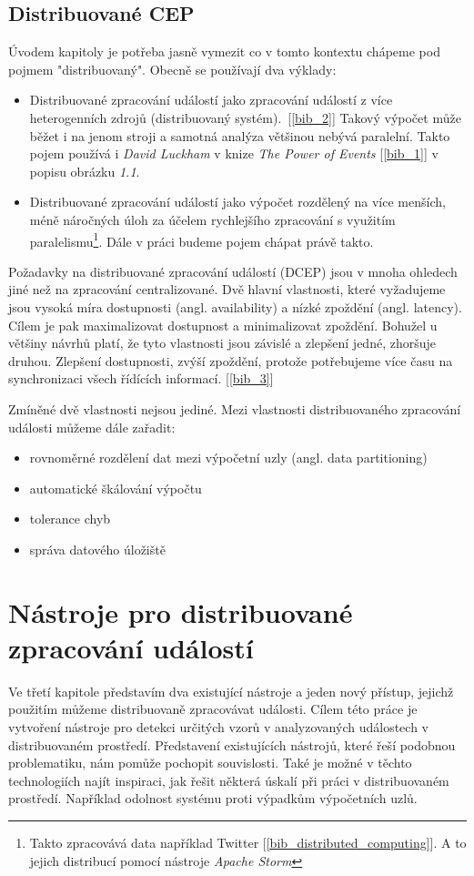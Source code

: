 \documentclass[
  digital, %
  table,   %
  nolof,     %
  nolot,     %
  oneside, %
  nocover,
  monochrome,
  12pt
]{fithesis3}
\begin{document}
\section{Distribuované CEP}
Úvodem kapitoly je potřeba jasně vymezit co v tomto kontextu chápeme pod pojmem "distribuovaný". Obecně se používají dva výklady:
\begin{itemize}
  \item Distribuované zpracování událostí jako zpracování událostí z více heterogenních zdrojů (distribuovaný systém).~[\ref{bib_2}] Takový výpočet může běžet i na jenom stroji a samotná analýza většinou nebývá paralelní. Takto pojem používá i \textit{David Luckham} v knize \textit{The Power of Events} [\ref{bib_1}] v popisu obrázku \textit{1.1}.
  \item Distribuované zpracování událostí jako výpočet rozdělený na více menších, méně náročných úloh za účelem rychlejšího zpracování s využitím paralelismu\footnote{Takto zpracovává data například Twitter [\ref{bib_distributed_computing}]. A to jejich distribucí pomocí nástroje \textit{Apache Storm}}. Dále v práci budeme pojem chápat právě takto.
\end{itemize}

Požadavky na distribuované zpracování událostí (DCEP) jsou v mnoha ohledech jiné než na zpracování centralizované. Dvě hlavní vlastnosti, které vyžadujeme jsou vysoká míra dostupnosti (angl. availability) a nízké zpoždění (angl. latency). Cílem je pak maximalizovat dostupnost a minimalizovat zpoždění. Bohužel u většiny návrhů platí, že tyto vlastnosti jsou závislé a zlepšení jedné, zhoršuje druhou. Zlepšení dostupnosti, zvýší zpoždění, protože potřebujeme více času na synchronizaci všech řídících informací. [\ref{bib_3}]

Zmíněné dvě vlastnosti nejsou jediné. Mezi vlastnosti distribuovaného zpracování události můžeme dále zařadit:
\begin{itemize}
  \item rovnoměrné rozdělení dat mezi výpočetní uzly (angl. data partitioning)
  \item automatické škálování výpočtu
  \item tolerance chyb
  \item správa datového úložiště
\end{itemize}

\chapter{Nástroje pro distribuované zpracování událostí}
Ve třetí kapitole představím dva existující nástroje a jeden nový přístup, jejichž použitím můžeme distribuovaně zpracovávat události. Cílem této práce je vytvoření nástroje pro detekci určitých vzorů v analyzovaných událostech v distribuovaném prostředí. Představení existujících nástrojů, které řeší podobnou problematiku, nám pomůže pochopit souvislosti. Také je možné v těchto technologiích najít inspiraci, jak řešit některá úskalí při práci v distribuovaném prostředí. Například odolnost systému proti výpadkům výpočetních uzlů.
 
\end{document}
